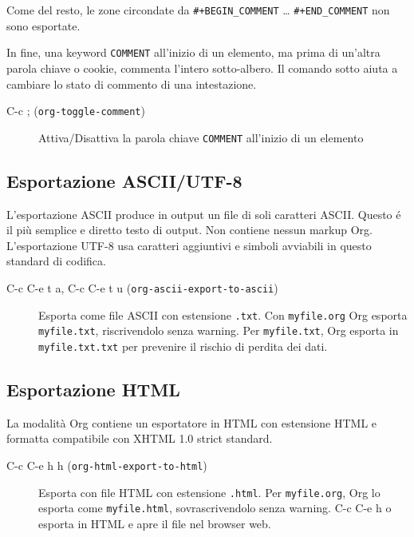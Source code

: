 \documentclass[11pt]{article}
\begin{document}
Come del resto, le zone circondate da \texttt{\#+BEGIN\_COMMENT}
\ldots{} \texttt{\#+END\_COMMENT} non sono esportate.

In fine, una keyword \texttt{COMMENT} all'inizio di un elemento, ma prima di
un'altra parola chiave o cookie, commenta l'intero sotto-albero. Il
comando sotto aiuta a cambiare lo stato di commento di una intestazione.

\begin{description}
\item[{C-c ; (\texttt{org-toggle-comment})}] Attiva/Disattiva la parola chiave \texttt{COMMENT} all'inizio di un
elemento
\end{description}

\subsection{Esportazione ASCII/UTF-8}
\label{sec:org3016a76}
L'esportazione ASCII produce in output un file di soli caratteri
ASCII. Questo é il più semplice e diretto testo di output. Non
contiene nessun markup Org. L'esportazione UTF-8 usa caratteri
aggiuntivi e simboli avviabili in questo standard di codifica.

\begin{description}
\item[{C-c C-e t a, C-c C-e t u (\texttt{org-ascii-export-to-ascii})}] Esporta come file ASCII con estensione \texttt{.txt}. Con \texttt{myfile.org} Org
esporta \texttt{myfile.txt}, riscrivendolo senza warning. Per \texttt{myfile.txt},
Org esporta in \texttt{myfile.txt.txt} per prevenire il rischio di perdita
dei dati.
\end{description}

\subsection{Esportazione HTML}
\label{sec:orgd553d27}
La modalità Org contiene un esportatore in HTML con estensione HTML e
formatta compatibile con XHTML 1.0 strict standard.

\begin{description}
\item[{C-c C-e h h (\texttt{org-html-export-to-html})}] Esporta con file HTML con estensione \texttt{.html}. Per \texttt{myfile.org}, Org
lo esporta come \texttt{myfile.html}, sovrascrivendolo senza
warning. C-c C-e h o esporta in HTML e apre il file nel
browser web.
\end{description}
\end{document}
